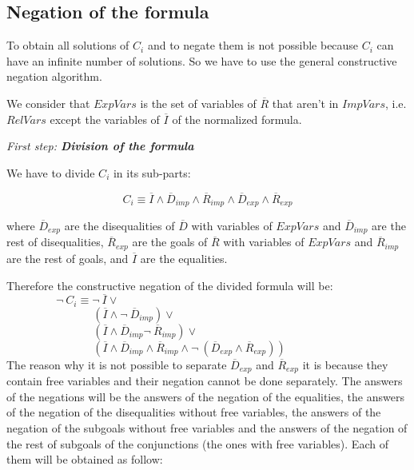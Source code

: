 \documentclass{llncs}
\begin{document}

\subsection{Negation of the formula}
\label{negation}

To obtain all solutions of $C_i$ and to negate them is not possible
because $C_i$ can have an infinite number of solutions. So we have to
use the general constructive negation algorithm.  

We consider that $ExpVars$ is the set of variables of $\overline{R}$
that aren't in $ImpVars$, i.e. $RelVars$ except the variables of
$\overline{I}$ of the normalized formula.

\noindent
{\em First step: {\bf Division of the formula}}

\noindent
We have to divide $C_i$ in its sub-parts:

\[C_i \equiv \overline{I} \wedge
        \overline{D}_{imp} \wedge \overline{R}_{imp} \wedge
        \overline{D}_{exp} \wedge \overline{R}_{exp} \]

\noindent
where $\overline{D}_{exp}$ are the disequalities of $\overline{D}$
with variables of $ExpVars$ and $\overline{D}_{imp}$ are the rest of
disequalities, $\overline{R}_{exp}$ are the goals of $\overline{R}$
with variables of $ExpVars$ and $\overline{R}_{imp}$ are the rest of
goals, and $\overline{I}$ are the equalities.

Therefore the constructive negation of the divided formula will be: \\

$~~~~~~~~~~~~~~~~~~~~\neg~C_i \equiv \neg~\overline{I} \vee $ \\
$~~~~~~~~~~~~~~~~~~~~~~~~~~~~~~~~~~~(\overline{I} \wedge \neg~\overline{D}_{imp}) \vee  $ \\
$~~~~~~~~~~~~~~~~~~~~~~~~~~~~~~~~~~~(\overline{I} \wedge \overline{D}_{imp} \neg~\overline{R}_{imp}) \vee $ \\
$~~~~~~~~~~~~~~~~~~~~~~~~~~~~~~~~~~~( \overline{I} \wedge \overline{D}_{imp} \wedge \overline{R}_{imp} \wedge \neg~(\overline{D}_{exp} \wedge \overline{R}_{exp})) $ \\

The reason why it is not possible to separate $\overline{D}_{exp}$ and
$\overline{R}_{exp}$ it is because they contain free variables and
their negation cannot be done separately. The answers of the negations
will be the answers of the negation of the equalities, the answers of
the negation of the disequalities without free variables, the answers
of the negation of the subgoals without free variables and the answers
of the negation of the rest of subgoals of the conjunctions (the ones
with free variables). Each of them will be obtained as follow:
\end{document}
